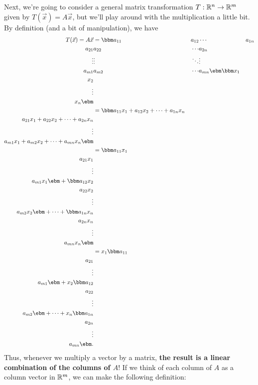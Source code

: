Next, we're going to consider a general matrix transformation $T:\mathbb{R}^n\to \mathbb{R}^m$ given by $T(\vec x) = A\vec x$, but we'll play around with the multiplication a little bit. By definition (and a bit of manipulation), we have
\begin{align*}
T(\vec x) = A\vec x & = 
		\bbm a_{11} & a_{12} & \cdots & a_{1n}\\
			 a_{21} & a_{22} & \cdots & a_{2n}\\
			 \vdots & \vdots & \ddots & \vdots\\
			 a_{m1} & a_{m2} & \cdots & a_{mn}\ebm 
		\bbm x_1\\x_2\\ \vdots \\ x_n\ebm\\
    & = \bbm a_{11}x_1+a_{12}x_2 + \cdots + a_{1n}x_n\\
             a_{21}x_1+a_{22}x_2 + \cdots + a_{2n}x_n\\
             \vdots\\
             a_{m1}x_1+a_{m2}x_2 + \cdots + a_{mn}x_n\ebm\\
    & = \bbm a_{11}x_1\\a_{21}x_1\\ \vdots \\ a_{m1}x_1\ebm + 
        \bbm a_{12}x_2\\a_{22}x_2\\ \vdots \\ a_{m2}x_2\ebm + \cdots +
        \bbm a_{1n}x_n\\a_{2n}x_n\\ \vdots \\ a_{mn}x_n\ebm\\
    & = x_1 \bbm a_{11}\\a_{21}\\ \vdots \\ a_{m1}\ebm + 
        x_2 \bbm a_{12}\\a_{22}\\ \vdots \\ a_{m2}\ebm + \cdots + 
        x_n \bbm a_{1n}\\a_{2n}\\ \vdots \\ a_{mn}\ebm.
\end{align*}
Thus, whenever we multiply a vector by a matrix, \textbf{the result is a linear combination of the columns of $A$}! If we think of each column of $A$ as a column vector in $\mathbb{R}^m$, we can make the following definition:

